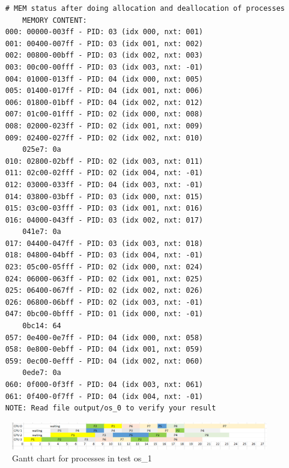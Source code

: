\documentclass[a4paper]{article}
\begin{document}
	\begin{lstlisting}
	# MEM status after doing allocation and deallocation of processes
    	MEMORY CONTENT: 
    000: 00000-003ff - PID: 03 (idx 000, nxt: 001)
    001: 00400-007ff - PID: 03 (idx 001, nxt: 002)
    002: 00800-00bff - PID: 03 (idx 002, nxt: 003)
    003: 00c00-00fff - PID: 03 (idx 003, nxt: -01)
    004: 01000-013ff - PID: 04 (idx 000, nxt: 005)
    005: 01400-017ff - PID: 04 (idx 001, nxt: 006)
    006: 01800-01bff - PID: 04 (idx 002, nxt: 012)
    007: 01c00-01fff - PID: 02 (idx 000, nxt: 008)
    008: 02000-023ff - PID: 02 (idx 001, nxt: 009)
    009: 02400-027ff - PID: 02 (idx 002, nxt: 010)
    	025e7: 0a
    010: 02800-02bff - PID: 02 (idx 003, nxt: 011)
    011: 02c00-02fff - PID: 02 (idx 004, nxt: -01)
    012: 03000-033ff - PID: 04 (idx 003, nxt: -01)
    014: 03800-03bff - PID: 03 (idx 000, nxt: 015)
    015: 03c00-03fff - PID: 03 (idx 001, nxt: 016)
    016: 04000-043ff - PID: 03 (idx 002, nxt: 017)
    	041e7: 0a
    017: 04400-047ff - PID: 03 (idx 003, nxt: 018)
    018: 04800-04bff - PID: 03 (idx 004, nxt: -01)
    023: 05c00-05fff - PID: 02 (idx 000, nxt: 024)
    024: 06000-063ff - PID: 02 (idx 001, nxt: 025)
    025: 06400-067ff - PID: 02 (idx 002, nxt: 026)
    026: 06800-06bff - PID: 02 (idx 003, nxt: -01)
    047: 0bc00-0bfff - PID: 01 (idx 000, nxt: -01)
    	0bc14: 64
    057: 0e400-0e7ff - PID: 04 (idx 000, nxt: 058)
    058: 0e800-0ebff - PID: 04 (idx 001, nxt: 059)
    059: 0ec00-0efff - PID: 04 (idx 002, nxt: 060)
    	0ede7: 0a
    060: 0f000-0f3ff - PID: 04 (idx 003, nxt: 061)
    061: 0f400-0f7ff - PID: 04 (idx 004, nxt: -01)
    NOTE: Read file output/os_0 to verify your result
	\end{lstlisting}
    \begin{figure}[h]
	    \centering
	    \includegraphics[width=\textwidth]{TEST3.PNG}
	    \caption{Gantt chart for processes in test os\_1}
	    \label{fig:my_label}
	\end{figure}
\end{document}
